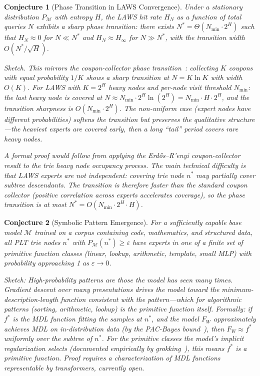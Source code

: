 \documentclass[11pt]{article}
\newtheorem{conjecture}{Conjecture}
\begin{document}
\begin{conjecture}[Phase Transition in LAWS Convergence]
\label{conj:phase}
Under a stationary distribution $P_{\mathcal{M}}$ with entropy $H$,
the LAWS hit rate $H_N$ as a function of total queries $N$ exhibits a
\emph{sharp phase transition}: there exists $N^* = \Theta(N_{\min} \cdot 2^H)$
such that $H_N \approx 0$ for $N \ll N^*$ and $H_N \approx H_\infty$ for
$N \gg N^*$, with the transition width $O(N^* / \sqrt{H})$.

\emph{Sketch.}
This mirrors the coupon-collector phase transition~\cite{blumer1989}: collecting
$K$ coupons with equal probability $1/K$ shows a sharp transition at $N = K \ln K$
with width $O(K)$.  For LAWS with $K = 2^H$ heavy nodes and per-node visit
threshold $N_{\min}$: the last heavy node is covered at $N \approx N_{\min} \cdot 2^H \ln(2^H)
= N_{\min} \cdot H \cdot 2^H$, and the transition sharpness is $O(N_{\min} \cdot 2^H)$.
The non-uniform case (expert nodes have different probabilities) softens the
transition but preserves the qualitative structure---the heaviest experts are
covered early, then a long ``tail'' period covers rare heavy nodes.

A formal proof would follow from applying the Erd\H{o}s--R'{e}nyi coupon-collector
result to the trie heavy node occupancy process.  The main technical difficulty
is that LAWS experts are not independent: covering trie node $n^*$ may partially
cover subtree descendants.  The transition is therefore \emph{faster} than the
standard coupon collector (positive correlation across experts accelerates
coverage), so the phase transition is at most $N^* = O(N_{\min} \cdot 2^H \cdot H)$.
\end{conjecture}

\begin{conjecture}[Symbolic Pattern Emergence]
\label{conj:symbolic}
For a sufficiently capable base model $\mathcal{M}$ trained on a corpus
containing code, mathematics, and structured data, all PLT trie nodes
$n^*$ with $P_{\mathcal{M}}(n^*) \geq \varepsilon$ have experts in one of a
finite set of primitive function classes (linear, lookup, arithmetic,
template, small MLP) with probability approaching 1 as $\varepsilon \to 0$.

\emph{Sketch:} High-probability patterns are those the model has seen many times.
Gradient descent over many presentations drives the model toward the
minimum-description-length function consistent with the pattern---which for
algorithmic patterns (sorting, arithmetic, lookup) is the primitive function itself.
Formally: if $f^*$ is the MDL function fitting the samples at $n^*$, and the model
$F_W$ approximately achieves MDL on in-distribution data (by the PAC-Bayes
bound~\cite{blumer1989}), then $F_W \approx f^*$ uniformly over the subtree of $n^*$.
For the primitive classes the model's implicit regularization selects (documented
empirically by grokking~\cite{symbolic_moe2025}), this means $f^*$ \emph{is}
a primitive function.  Proof requires a characterization of MDL functions
representable by transformers, currently open.
\end{conjecture}
\end{document}
